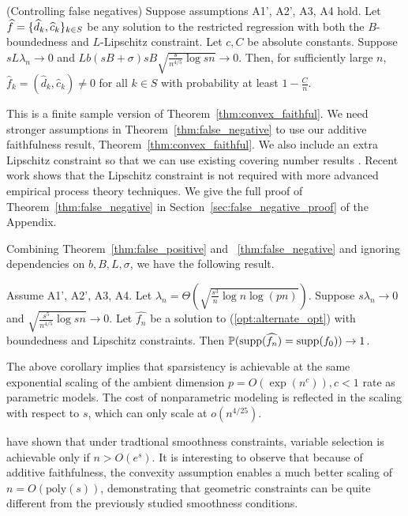 \begin{theorem} (Controlling false negatives)
\label{thm:false_negative}
Suppose assumptions A1', A2', A3, A4 hold. Let $\displaystyle \widehat{f} = \{ \widehat{d}_k, \widehat{c}_k\}_{k\in S}$ be any solution to the restricted regression with both the $B$-boundedness and $L$-Lipschitz constraint. Let $c,C$ be absolute constants.
Suppose $s L \lambda_n \rightarrow 0$ and $Lb(sB+\sigma)sB \sqrt{\frac{s}{n^{4/5}} \log sn} \rightarrow 0$.
Then, for sufficiently large $n$, $\hat{f}_k = (\hat{d}_k, \hat{c}_k)
\neq 0$ for all $k \in S$ with probability at least $1-\frac{C}{n}$.
\end{theorem}

This is a finite sample version of
Theorem~\ref{thm:convex_faithful}. We need stronger assumptions in
Theorem~\ref{thm:false_negative} to use our additive faithfulness
result, Theorem~\ref{thm:convex_faithful}. We also include an extra
Lipschitz constraint so that we can use existing covering number
results \cite{Bronshtein:76}. Recent work
\cite{Guntu:13} shows that the Lipschitz constraint
is not required with more advanced empirical process theory
techniques. We give the full proof of Theorem~\ref{thm:false_negative}
in Section~\ref{sec:false_negative_proof} of the Appendix.

Combining Theorem~\ref{thm:false_positive} and
~\ref{thm:false_negative} and ignoring dependencies on $b,B,L,\sigma$,
we have the following result.
\begin{corollary}
  Assume A1', A2', A3, A4. Let $\lambda_n = \Theta\left( \sqrt{
  \frac{s^3}{n} \log n \log (pn)} \right)$. Suppose $s \lambda_n
  \rightarrow 0$ and $\sqrt{\frac{s^5}{n^{4/5}} \log sn} \rightarrow
  0$. Let $\hat{f_n}$ be a solution to (\ref{opt:alternate_opt}) with
  boundedness and Lipschitz constraints. Then 
  ${\mathbb P}( \textrm{supp}(\widehat{f_n}) = \textrm{supp}(f_0) ) \rightarrow 1$.
\end{corollary}
The above corollary implies that sparsistency is achievable at the same exponential scaling of the ambient dimension $p = O(\exp(n^c)), c<1$ rate as parametric models. The cost of nonparametric modeling is reflected in the scaling with respect to $s$, which can only scale at $o(n^{4/25})$.

\citet{dalalyan:12} have shown that under tradtional smoothness constraints, variable selection is achievable only if $n > O(e^s)$. It is interesting to observe that because of additive faithfulness, the convexity assumption enables a much better scaling of $n = O(\textrm{poly}(s))$, demonstrating that geometric constraints can be quite different from the previously studied smoothness conditions.




 
